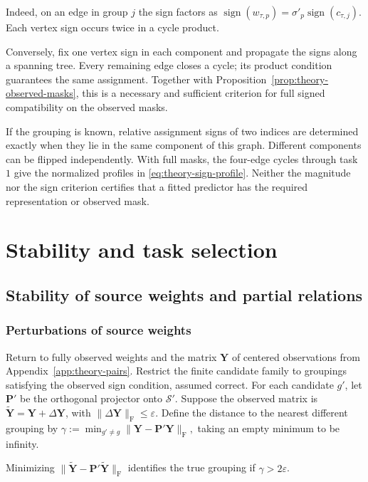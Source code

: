 Indeed, on an edge in group $j$ the sign factors as
$\operatorname{sign}(w_{\tau,p})=\sigma'_p\operatorname{sign}(c_{\tau,j})$.
Each vertex sign occurs twice in a cycle product.

Conversely, fix one vertex sign in each component and propagate
the signs along a spanning tree. Every remaining edge closes
a cycle; its product condition guarantees the same assignment.
Together with Proposition~\ref{prop:theory-observed-masks}, this
is a necessary and sufficient criterion for full signed
compatibility on the observed masks.

If the grouping is known, relative assignment signs of two indices
are determined exactly when they lie in the same component of
this graph. Different components can be flipped independently.
With full masks, the four-edge cycles through task $1$ give the
normalized profiles in \eqref{eq:theory-sign-profile}.
Neither the magnitude nor the sign criterion certifies that
a fitted predictor has the required representation or observed mask.

\section{Stability and task selection}
\label{app:theory-additional}

\subsection{Stability of source weights and partial relations}
\label{app:theory-noise}

\subsubsection{Perturbations of source weights}

Return to fully observed weights and the matrix $\mathbf Y$ of
centered observations from Appendix~\ref{app:theory-pairs}. Restrict the finite candidate family to
groupings satisfying the observed sign condition, assumed correct.
For each candidate $g'$, let $\mathbf P'$ be the
orthogonal projector onto $\mathcal S'$.
Suppose the observed matrix is
$\widetilde{\mathbf Y}=\mathbf Y+\Delta\mathbf Y$, with
$\|\Delta\mathbf Y\|_{\mathrm F}\le\varepsilon$.
Define the distance to the nearest different grouping by
$
    \gamma:=\min_{g'\ne g}
         \|\mathbf Y-\mathbf P'\mathbf Y\|_{\mathrm F},
$
taking an empty minimum to be infinity.

\begin{proposition}
    \label{prop:theory-residual-separation}
    Minimizing
    $\|\widetilde{\mathbf Y}-\mathbf P'\widetilde{\mathbf Y}\|_{\mathrm F}$
    identifies the true grouping if $\gamma>2\varepsilon$.
\end{proposition}

